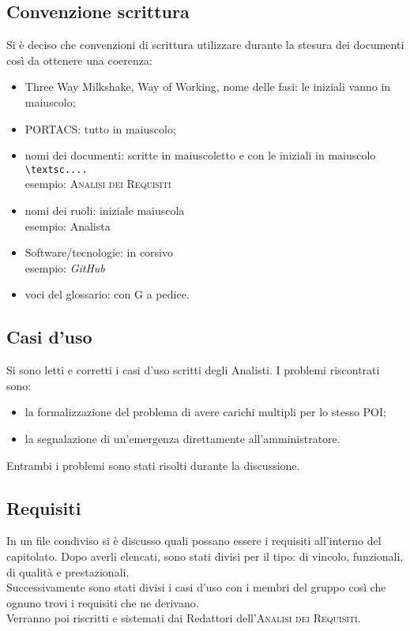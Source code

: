 \subsection{Convenzione scrittura}
Si è deciso che convenzioni di scrittura utilizzare durante la stesura dei documenti così da ottenere una coerenza:
\begin{itemize}
\item Three Way Milkshake, Way of Working, nome delle fasi: le iniziali vanno in maiuscolo;
\item PORTACS: tutto in maiuscolo;
\item nomi dei documenti: scritte in maiuscoletto e con le iniziali in maiuscolo \texttt{\textbackslash textsc{....}} \\esempio: \textsc{Analisi dei Requisiti}
\item nomi dei ruoli: iniziale maiuscola 
\\esempio: Analista
\item Software/tecnologie: in corsivo 
\\esempio: \textit{GitHub}
\item voci del glossario: con G a pedice.
\end{itemize}

\subsection{Casi d'uso}
Si sono letti e corretti i casi d'uso scritti degli Analisti. I problemi riscontrati sono:
\begin{itemize}
	\item la formalizzazione del problema di avere carichi multipli per lo stesso POI;
	\item la segnalazione di un'emergenza direttamente all'amministratore.
\end{itemize}
Entrambi i problemi sono stati risolti durante la discussione.

\subsection{Requisiti}
In un file condiviso si è discusso quali possano essere i requisiti all'interno del capitolato. Dopo averli elencati, sono stati divisi per il tipo: di vincolo, funzionali, di qualità e prestazionali. \\Successivamente sono stati divisi i casi d'uso con i membri del gruppo così che ognuno trovi i requisiti che ne derivano. \\Verranno poi riscritti e sistemati dai Redattori dell'\textsc{Analisi dei Requisiti}.

